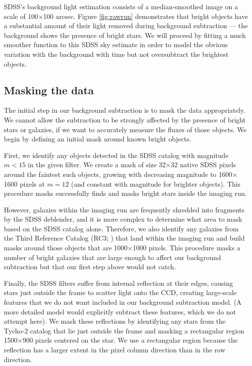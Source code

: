 \documentclass[10pt,preprint]{aastex}
\begin{document}
SDSS's background light estimation consists of a median-smoothed image
on a scale of 100$\times$100 arcsec. Figure \ref{fig:rawrun}
demonstrates that bright objects have a substantial amount of their
light removed during background subtraction --- the background shows
the presence of bright stars.  We will proceed by fitting a much
smoother function to this SDSS sky estimate in order to model the
obvious variation with the background with time but not oversubtract
the brightest objects.

\subsection{Masking the data}
\label{sec:mask}

The initial step in our background subtraction is to mask the data
appropriately. We cannot allow the subtraction to be strongly affected
by the presence of bright stars or galaxies, if we want to accurately
measure the fluxes of those objects. We begin by defining an initial
mask around known bright objects.

First, we identify any objects detected in the SDSS catalog with
magnitude $m<15$ in the given filter. We create a mask of size
32$\times$32 native SDSS pixels around the faintest such objects,
growing with decreasing magnitude to 1600$\times$1600 pixels at $m=12$
(and constant with magnitude for brighter objects).  This procedure
masks successfully finds and masks bright stars inside the imaging
run.

However, galaxies within the imaging run are frequently shredded into
fragments by the SDSS deblender, and it is more complex to determine
what area to mask based on the SDSS catalog alone. Therefore, we also
identify any galaxies from the Third Reference Catalog (RC3;
\citealt{devaucouleurs91a}) that land within the imaging run and build
masks around those objects that are 1000$\times$1000 pixels.  This
procedure masks a number of bright galaxies that are large enough to
affect our background subtraction but that our first step above would
not catch.

Finally, the SDSS filters suffer from internal reflection at their
edges, causing stars just outside the frame to scatter light onto the
CCD, creating large-scale features that we do not want included in our
background subtraction model. (A more detailed model would explicitly
subtract these features, which we do not attempt here).  We mask these
reflections by identifying any stars from the Tycho-2 catalog that lie
just outside the frame and masking a rectangular region
1500$\times$900 pixels centered on the star. We use a rectangular
region because the reflection has a larger extent in the pixel column
direction than in the row direction.
\end{document}
